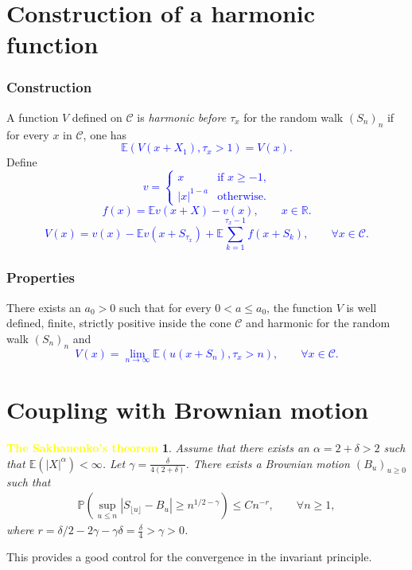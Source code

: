 \documentclass[serif,professionalfont,tree,usepdftitle=false, slidestop]{beamer}
\numberwithin{equation}{section}
\newcommand{\duong}[1]{\textcolor{blue}{#1}}
\newcommand{\vang}[1]{\textcolor{yellow}{#1}}
\begin{document}
\section{Construction of a harmonic function}
\frametitle{Construction} 
\begin{frame}
A function $V$ defined on $\mathcal C$ is \textit{harmonic before $\tau_x$} for the random walk $(S_n)_n$ if for every $x$ in $\mathcal C$, one has
\duong{\begin{equation}\label {dw3}
\mathbb E\left(V(x + X_1), \tau_x > 1\right) = V(x).\nonumber
\end{equation}
}Define
\duong{ \begin{displaymath}
v = \left\{
\begin{array}{ll}
x & \textrm {if $x\ge -1$,}\\
|x|^{1-a} & \textrm{otherwise.}
\end{array}
\right.
\end{displaymath}
 \begin{equation} \label {dw1}
f(x) = \mathbb Ev(x+X) - v(x), \qquad x \in \mathbb R.\nonumber
\end{equation} }
\duong{\begin{equation} \label {dw2}
V(x) = v(x) - \mathbb Ev(x + S_{\tau_x}) + \mathbb E\sum_{k=1}^{\tau_x - 1} f(x + S_k), \qquad \forall x \in \mathcal C.\nonumber
\end{equation}
}\end{frame}

\begin{frame}
\frametitle{Properties} 
There exists an $a_0>0$ such that for every $0<a\leq a_0$, the function $V$ is well defined, finite, strictly positive inside the cone $\mathcal C$ and harmonic for the random walk $(S_n)_n$ and
\duong{\begin{equation}\label {dw17}
V(x) = \lim_{n\to\infty} \mathbb E\left(u(x+S_n), \tau_x>n\right),\qquad \forall x\in \mathcal C.\nonumber
\end{equation}}
\end{frame}

\section{Coupling with Brownian motion}
\begin{frame}
\newtheorem*{thm2}{\vang{\large \bf The Sakhanenko's theorem}}
\begin{thm2}
Assume that there exists an $\alpha = 2+\delta > 2$ such that $\mathbb E(|X|^\alpha) < \infty$. Let $\gamma = \frac{\delta}{4(2+\delta)}$.
There exists a Brownian motion $(B_u)_{u\ge 0}$ such that
\begin{eqnarray}\label{dw22}
\mathbb P\left(\sup_{u\le n} \left|S_{\lfloor u\rfloor}-B_u\right| \ge n^{1/2-\gamma}\right)\le Cn^{-r}, \qquad \forall n\ge 1,\nonumber
\end{eqnarray}
where $r =\delta/2 -2\gamma - \gamma\delta = \frac{\delta}{4}>\gamma> 0$.
\end{thm2}
This provides a good control for the convergence in the invariant principle.
\end{frame}
\end{document}
